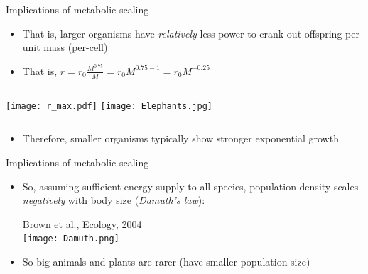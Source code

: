 \begin{frame}{Implications of metabolic scaling}

  \begin{itemize}
    \item That is, larger organisms have {\it relatively} less power to crank out offspring per-unit mass (per-cell)\footnotemark~
    \item That is, $r = r_0 \frac{M^{0.75}}{M} =r_0 M^{0.75-1} = r_0 M^{-0.25} $ 
  \end{itemize}

  \begin{columns}[c]
    \centering
    \centering
    \texttt{[image: r\_max.pdf]}
    \centering
    \pause
    \texttt{[image: Elephants.jpg]}
  \end{columns}

  \begin{itemize}
    \item Therefore, smaller organisms typically show stronger exponential growth
  \end{itemize}
\end{frame}

\begin{frame}{Implications of metabolic scaling}

  \begin{itemize}[<+->]\itemsep3pt
    \item So, assuming sufficient energy supply to all species, population density scales {\it negatively} with body size ({\it Damuth's law}):
    \begin{center}
      {\tiny Brown et al., Ecology, 2004}\\
      \texttt{[image: Damuth.png]}
  \end{center}
  \item So big animals and plants are rarer (have smaller population size) 
\end{itemize} 

\end{frame}

